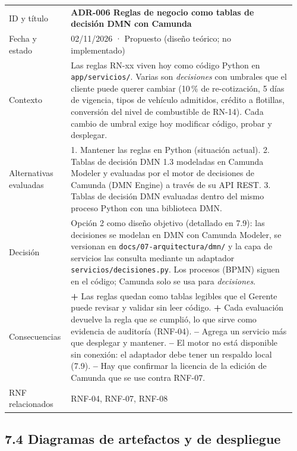 {\begin{longtable}{@{}L{0.2\linewidth}L{0.76\linewidth}@{}}
ID y título & \textbf{ADR-006 Reglas de negocio como tablas de decisión DMN con Camunda} \\
Fecha y estado & 02/11/2026 · Propuesto (diseño teórico; no implementado) \\
Contexto & Las reglas RN-xx viven hoy como código Python en \texttt{app/servicios/}. Varias son
\emph{decisiones} con umbrales que el cliente puede querer cambiar (10\,\% de re-cotización, 5 días de
vigencia, tipos de vehículo admitidos, crédito a flotillas, conversión del nivel de combustible de RN-14).
Cada cambio de umbral exige hoy modificar código, probar y desplegar. \\
Alternativas evaluadas & 1. Mantener las reglas en Python (situación actual). 2. Tablas de decisión
DMN 1.3 modeladas en Camunda Modeler y evaluadas por el motor de decisiones de Camunda (DMN Engine) a
través de su API REST. 3. Tablas de decisión DMN evaluadas dentro del mismo proceso Python con una
biblioteca DMN. \\
Decisión & Opción 2 como diseño objetivo (detallado en 7.9): las decisiones se modelan en DMN con Camunda
Modeler, se versionan en \texttt{docs/07-arquitectura/dmn/} y la capa de servicios las consulta mediante
un adaptador \texttt{servicios/decisiones.py}. Los procesos (BPMN) siguen en el código; Camunda solo se
usa para \emph{decisiones}. \\
Consecuencias & \textbf{+} Las reglas quedan como tablas legibles que el Gerente puede revisar y validar
sin leer código. \textbf{+} Cada evaluación devuelve la regla que se cumplió, lo que sirve como evidencia
de auditoría (RNF-04). \textbf{--} Agrega un servicio más que desplegar y mantener. \textbf{--} El
motor no está disponible sin conexión: el adaptador debe tener un respaldo local (7.9). \textbf{--}
Hay que confirmar la licencia de la edición de Camunda que se use contra RNF-07. \\
RNF relacionados & RNF-04, RNF-07, RNF-08 \\
\end{longtable}
}

\subsection{7.4 Diagramas de artefactos y de
despliegue}\label{diagramas-de-artefactos-y-de-despliegue}


